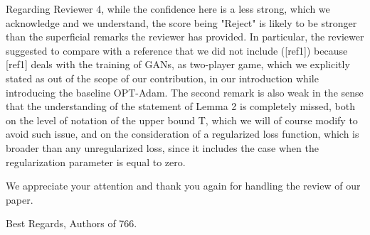 \documentclass{article}
\begin{document}
Regarding Reviewer 4, while the confidence here is a less strong, which we acknowledge and we understand, the score being "Reject" is likely to be stronger than the superficial remarks the reviewer has provided. In particular, the reviewer suggested to compare with a reference that we did not include ([ref1]) because [ref1] deals with the training of GANs, as two-player game, which we explicitly stated as out of the scope of our contribution, in our introduction while introducing the baseline OPT-Adam. The second remark is also weak in the sense that the understanding of the statement of Lemma 2 is completely missed, both on the level of notation of the upper bound T, which we will of course modify to avoid such issue, and on the consideration of a regularized loss function, which is broader than any unregularized loss, since it includes the case when the regularization parameter is equal to zero.


We appreciate your attention and thank you again for handling the review of our paper. 

Best Regards,
Authors of 766.
\end{document}
